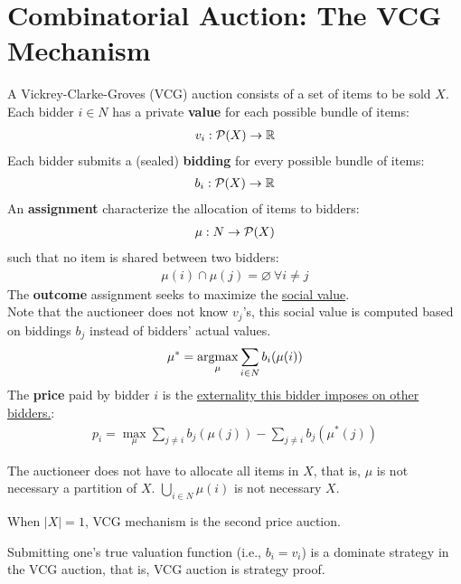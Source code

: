 \documentclass{article}
\begin{document}
	\section{Combinatorial Auction: The VCG Mechanism}
	\begin{definition}
		A Vickrey-Clarke-Groves (VCG) auction consists of a set of items to be sold $X$. Each bidder $i \in N$ has a private \textbf{value} for each possible bundle of items:
		\begin{align}
			v_i: \mathcal{{P}}(X) \to \mathbb{R}
		\end{align}
		Each bidder submits a (sealed) \textbf{bidding} for every possible bundle of items:
		\begin{align}
			b_i: \mathcal{{P}}(X) \to \mathbb{R}
		\end{align}
		An \textbf{assignment} characterize the allocation of items to bidders:
		\begin{align}
			\mu: N \to \mathcal{{P}}(X)
		\end{align}
		such that no item is shared between two bidders:
		\begin{align}
			\mu(i) \cap \mu(j) = \varnothing\ \forall i \neq j
		\end{align}
		The \textbf{outcome} assignment seeks to maximize the \ul{social value}. \\
		Note that the auctioneer does not know $v_j$'s, this social value is computed based on biddings $b_j$ instead of bidders' actual values.
		\begin{align}
			\mu^* = \operatorname*{argmax}_{\mu} \sum_{i \in N} b_i(\mu(i))
		\end{align}
		The \textbf{price} paid by bidder $i$ is the \ul{externality this bidder imposes on other bidders.}:
		\begin{align}
			p_i = \max_\mu \sum_{j \neq i} b_j(\mu(j)) - \sum_{j \neq i}b_j(\mu^*(j))
		\end{align}
	\end{definition}
	
	\begin{remark}
		The auctioneer does not have to allocate all items in $X$, that is, $\mu$ is not necessary a partition of $X$. $\bigcup_{i \in N}\mu(i)$ is not necessary $X$.
	\end{remark}
	
	\begin{remark}
		When $|X| = 1$, VCG mechanism is the second price auction.
	\end{remark}
	
	\begin{proposition}
		Submitting one's true valuation function (i.e., $b_i = v_i$) is a dominate strategy in the VCG auction, that is, VCG auction is strategy proof.
	\end{proposition}
	
\end{document}
